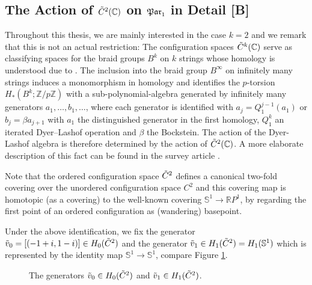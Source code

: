 \subsection{The Action of \texorpdfstring{${\tilde C^{2}}(\mathbb C)$}{C2C} on \texorpdfstring{$\mathfrak{Par}_1$}{Par1} in Detail [B]}
Throughout this thesis, we are mainly interested in the case $k=2$ and we remark that this is not an actual restriction:
The configuration spaces ${\tilde C^{k}}(\mathbb C)$ serve as classifying spaces for the braid groups $B^k$ on $k$ strings whose homology is understood due to \cite{CohenLadaMay1976}.
The inclusion into the braid group $B^\infty$ on infinitely many strings induces a monomorphism in homology and
identifies the $p$-torsion $H_\ast(B^k;\mathbb Z / p\mathbb Z)$ with a sub-polynomial-algebra generated by infinitely many generators $a_1, \ldots, b_1, \ldots$,
where each generator is identified with $a_j = Q_1^{j-1}(a_1)$ or $b_j = \beta a_{j+1}$
with $a_1$ the distinguished generator in the first homology, $Q_1^k$ an iterated Dyer--Lashof operation and $\beta$ the Bockstein.
The action of the Dyer-Lashof algebra is therefore determined by the action of ${\tilde C^{2}}(\mathbb C)$.
A more elaborate description of this fact can be found in the survey article \cite{Vershinin1998}.

Note that the ordered configuration space ${\tilde C^{2}}$ defines a canonical two-fold covering over the unordered configuration space $C^2$ and this
covering map is homotopic (as a covering) to the well-known covering $\mathbb S^1 \to \mathbb RP^1$, by regarding the first point of an ordered configuration as (wandering) basepoint.
\begin{defi}
    \label{homology_operations:parallel_patching_slit_pics:generators_v}
    Under the above identification, we fix the generator $\tilde v_0 = [(-1 + i, 1 - i)] \in H_0({\tilde C^{2}})$ and the generator $\tilde v_1 \in H_1({\tilde C^{2}}) = H_1(\mathbb S^1)$
    which is represented by the identity map $\mathbb S^1 \to \mathbb S^1$, compare Figure \ref{homology_operations:parallel_patching_slit_pics:tilde_v_0_and_tilde_v_1}.
\end{defi}
\begin{figure}[ht]
    \centering
    \def\svgwidth{.2\columnwidth}
    
    \hspace{3cm}
    \def\svgwidth{.2\columnwidth}
    
    \caption{\label{homology_operations:parallel_patching_slit_pics:tilde_v_0_and_tilde_v_1}The generators $\tilde v_0 \in H_0({\tilde C^{2}})$ and $\tilde v_1 \in H_1({\tilde C^{2}})$.}
\end{figure}

